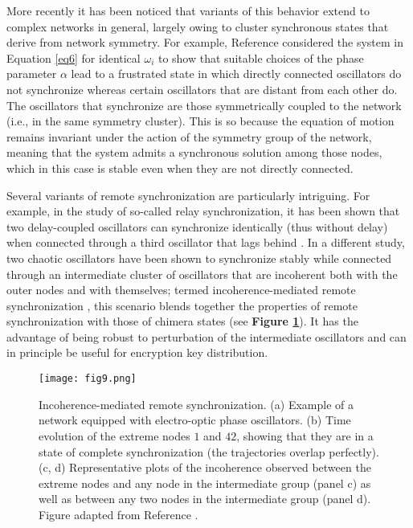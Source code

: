 \documentclass[
preprint,
superscriptaddress,
aps,
prl,
]{revtex4-1}
\begin{document}
More recently it has been noticed that variants of this behavior  
  {\color{black} extend}
to complex networks in general, largely owing to cluster synchronous states that derive from network symmetry. For example, Reference \cite{nicosia2013remote} considered the system in Equation \ref{eq6} for identical $\omega_i$  
to show that suitable choices of the phase parameter $\alpha$ lead to a frustrated state in which directly connected oscillators do not synchronize whereas certain oscillators that are distant from each other do. The oscillators that synchronize are 
those symmetrically coupled to the network (i.e., in the same symmetry cluster).
This is 
{\color{black} so}
because the equation of motion remains invariant under the action of the symmetry group of the network, meaning that the system admits a synchronous solution among those nodes, which
{\color{black}  in this case is}
stable even when they are not directly connected.

Several variants of remote synchronization are particularly intriguing. For example, in the study of so-called relay synchronization, it has been shown that two delay-coupled oscillators can synchronize identically (thus without delay) when connected through a third oscillator that lags behind \cite{fischer2006zero}. In a different study, 
two chaotic oscillators have been shown to synchronize stably while connected through an intermediate cluster of oscillators that are incoherent both with the outer nodes and with themselves; termed incoherence-mediated remote synchronization \cite{zhang2017incoherence}, this scenario blends together the properties of remote synchronization with those of chimera states (see \textbf{Figure \ref{fig9}}).  It  has the advantage of being robust to perturbation of the intermediate oscillators and can in principle be useful for encryption key distribution.

\begin{figure}[t]
\texttt{[image: fig9.png]}
\caption{Incoherence-mediated remote synchronization. (a) Example of a network equipped with electro-optic phase oscillators. (b) Time evolution of the extreme nodes $1$ and $42$, showing that they are in a state of complete synchronization (the trajectories overlap perfectly). (c, d) Representative plots of the incoherence observed between the extreme nodes and any node in the intermediate group (panel c) as well as between any two nodes in the intermediate group (panel d).
Figure adapted from Reference \cite{zhang2017incoherence}.
}
\label{fig9}
\end{figure}
\end{document}
